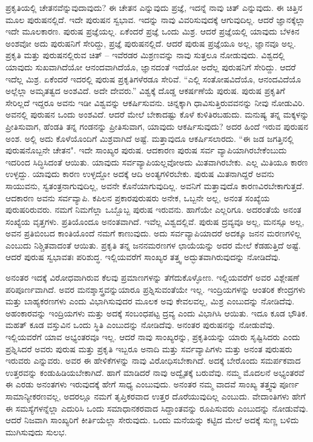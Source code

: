 ಪ್ರಕೃತಿಯಲ್ಲಿ ಚೇತನವೆನ್ನುವುದಾವುದು? ಈ ಚೇತನ ಎನ್ನುವುದು ಪ್ರಜ್ಞೆ, ಇದನ್ನೆ ನಾವು ಚಿತ್ ಎನ್ನುವುದು. ಈ ಚಿತ್ತಿನ ಮೂಲ ಪುರುಷನಲ್ಲಿದೆ. ಇದೇ ಪುರುಷನ ಸ್ವಭಾವ. ಇದನ್ನು ನಾವು ವಿವರಿಸುವುದಕ್ಕೆ ಆಗುವುದಿಲ್ಲ. ಆದರೆ ಜ್ಞಾನಕ್ಕೆಲ್ಲಾ ಇದೇ ಮೂಲಕಾರಣ. ಪುರುಷ ಪ್ರಜ್ಞೆಯಲ್ಲ. ಏಕೆಂದರೆ ಪ್ರಜ್ಞೆ ಒಂದು ಮಿಶ್ರ. ಆದರೆ ಪ್ರಜ್ಞೆಯಲ್ಲಿ ಯಾವುದು ಬೆಳಕಿನ ಅಂಶವೋ ಅದು ಪುರುಷನಿಗೆ ಸೇರಿದ್ದು, ಪ್ರಜ್ಞೆ ಪುರುಷನಲ್ಲಿದೆ. ಆದರೆ ಪುರುಷ ಪ್ರಜ್ಞೆಯೂ ಅಲ್ಲ, ಜ್ಞಾನವೂ ಅಲ್ಲ. ಪ್ರಕೃತಿ ಮತ್ತು ಪುರುಷನಲ್ಲಿರುವ ಚಿತ್ – ಇವೆರಡರ ಮಿಶ್ರಣವನ್ನು ನಾವು ಸುತ್ತಲೂ ನೋಡುವುದು. ವಿಶ್ವದಲ್ಲಿ ಯಾವುದು ಸುಖವಾಗಿದೆಯೋ ಆನಂದವಾಗಿದೆಯೊ, ಜ್ಞಾನದಂತೆ ಇದೆಯೋ ಅದೆಲ್ಲ ಪುರುಷನಿಗೆ ಸೇರಿದ್ದು. ಆದರೆ ಇದೆಲ್ಲ ಮಿಶ್ರ. ಏಕೆಂದರೆ ಇದರಲ್ಲಿ ಪುರುಷ ಪ್ರಕೃತಿಗಳೆರಡೂ ಸೇರಿವೆ. “ಎಲ್ಲಿ ಸಂತೋಷವಿದೆಯೊ, ಆನಂದವಿದೆಯೊ ಅಲ್ಲೆಲ್ಲಾ ಅಮೃತತ್ವದ ಅಂಶವಿದೆ. ಅದೇ ದೇವರು.'' ವಿಶ್ವಕ್ಕೆ ದೊಡ್ಡ ಆಕರ್ಷಣೆಯೆ ಪುರುಷ. ಪುರುಷ ಪ್ರಕೃತಿಗೆ ಸೇರಿಲ್ಲದೆ ಇದ್ದರೂ ಅವನು ಇಡೀ ವಿಶ್ವವನ್ನು ಆಕರ್ಷಿಸುವನು. ಚಿನ್ನಕ್ಕಾಗಿ ಧಾವಿಸುತ್ತಿರುವವನನ್ನು ನೀವು ನೋಡುವಿರಿ. ಅವನಲ್ಲಿ ಪುರುಷನ ಒಂದು ಅಂಶವಿದೆ. ಆದರೆ ಮೇಲೆ ಬೇಕಾದಷ್ಟು ಕೊಳೆ ಕುಳಿತಿರಬಹುದು. ಮನುಷ್ಯ ತನ್ನ ಮಕ್ಕಳನ್ನು ಪ್ರೀತಿಸುವಾಗ, ಹೆಂಡತಿ ತನ್ನ ಗಂಡನನ್ನು ಪ್ರೀತಿಸುವಾಗ, ಯಾವುದು ಆಕರ್ಷಿಸುವುದು? ಅದರ ಹಿಂದೆ ಇರುವ ಪುರುಷನ ಅಂಶ. ಅಲ್ಲಿ ಅದು ಕೊಳೆಯೊಂದಿಗೆ ಮಿಶ್ರವಾಗಿದೆ ಅಷ್ಟೆ. ಮತ್ತಾವುದೂ ಆಕರ್ಷಿಸಲಾರದು. “ಈ ಜಡ ಜಗತ್ತಿನಲ್ಲಿ ಪುರುಷನೊಬ್ಬನೇ ಚೇತನ". ಇದೇ ಸಾಂಖ್ಯರ ಪುರುಷ. ಆದಕಾರಣ ಪುರುಷ ಸರ್ವ ವ್ಯಾಪಿಯಾಗಿರಬೇಕೆಂಬುದು ಇದರಿಂದ ಸಿದ್ಧಿಸಿದಂತೆ ಆಯಿತು. ಯಾವುದು ಸರ್ವವ್ಯಾಪಿಯಲ್ಲವೋ\break ಅದು ಮಿತವಾಗಿರಬೇಕು. ಎಲ್ಲ ಮಿತಿಯೂ ಕಾರಣ ಉಳ್ಳದ್ದು. ಯಾವುದು ಕಾರಣ ಉಳ್ಳದ್ದೋ ಅದಕ್ಕೆ ಆದಿ ಅಂತ್ಯಗಳಿರಬೇಕು. ಪುರುಷ ಮಿತನಾಗಿದ್ದರೆ ಅವನು ಸಾಯುವನು, ಸ್ವತಂತ್ರನಾಗುವುದಿಲ್ಲ, ಅವನೇ ಕೊನೆಯಾಗುವುದಿಲ್ಲ. ಅವನಿಗೆ ಮತ್ತಾವುದೊ ಕಾರಣವಿರಬೇಕಾಗುತ್ತದೆ. ಆದಕಾರಣ ಅವನು ಸರ್ವವ್ಯಾಪಿ. ಕಪಿಲನ ಪ್ರಕಾರ\break ಪುರುಷರು ಅನೇಕ, ಒಬ್ಬನೇ ಅಲ್ಲ, ಅನಂತ ಸಂಖ್ಯೆಯ ಪುರುಷರಿರುವರು. ನಮಗೆ ನಿಮಗೆಲ್ಲಾ ಒಬ್ಬೊಬ್ಬ ಪುರುಷ ಇರುವನು. ಹಾಗೆಯೇ ಎಲ್ಲರಿಗೂ. ಅದರಂತೆಯೆ ಅನಂತ ಸಂಖ್ಯೆಯ ವೃತ್ತಗಳು. ಪ್ರತಿಯೊಂದೂ ಅನಂತವಾಗಿದೆ. ಇವೆಲ್ಲ ವಿಶ್ವದಲ್ಲಿವೆ. ಪುರುಷ ದ್ರವ್ಯವೂ ಅಲ್ಲ, ಮನಸ್ಸೂ ಅಲ್ಲ, ಅವನ ಪ್ರತಿಬಿಂಬದ ಕಾಂತಿಯೊಂದೆ ನಮಗೆ ಕಾಣುವುದು. ಅದು ಸರ್ವವ್ಯಾಪಿಯಾದರೆ ಅದಕ್ಕೂ ಜನನ ಮರಣಗಳಿಲ್ಲ ಎಂಬುದು ನಿಶ್ಚಿತವಾದಂತೆ ಆಯಿತು. ಪ್ರಕೃತಿ ತನ್ನ ಜನನಮರಣಗಳ ಛಾಯೆಯನ್ನು ಅದರ ಮೇಲೆ ಕೆಡಹುತ್ತಿದೆ ಅಷ್ಟೆ. ಆದರೆ ಪುರುಷ ಸ್ವಭಾವತಃ ಪರಿಶುದ್ಧ. ಇಲ್ಲಿಯವರೆಗೆ ಸಾಂಖ್ಯರ ತತ್ತ್ವ ಅದ್ಭುತವಾಗಿರುವುದನ್ನು ನೋಡಿದೆವು.

ಅನಂತರ ಇದಕ್ಕೆ ವಿರೋಧವಾಗಿರುವ ಕೆಲವು ಪ್ರಮಾಣಗಳನ್ನು ತೆಗೆದುಕೊಳ್ಳೋಣ. ಇಲ್ಲಿಯವರೆಗೆ ಅವರ ವಿಶ್ಲೇಷಣೆ ಪರಿಪೂರ್ಣವಾಗಿದೆ. ಅವರ ಮನಶ್ಶಾಸ್ತ್ರವನ್ನು\break ಯಾರೂ ಪ್ರಶ್ನಿಸುವಂತೆಯೇ ಇಲ್ಲ. ಇಂದ್ರಿಯಗಳನ್ನು ಆಂತರಿಕ ಕೇಂದ್ರಗಳು ಮತ್ತು ಬಾಹ್ಯಕರಣಗಳು ಎಂದು ವಿಭಾಗಿಸುವುದರ ಮೂಲಕ ಅವು ಕೇವಲವಲ್ಲ, ಮಿಶ್ರ ಎಂಬುದನ್ನು ನೋಡಿದೆವು. ಅಹಂಕಾರವನ್ನು ಇಂದ್ರಿಯಗಳು ಮತ್ತು ಅದಕ್ಕೆ ಸಂಬಂಧಪಟ್ಟ ದ್ರವ್ಯ ಎಂದು ವಿಭಾಗಿಸಿ ಆಯಿತು. ಇದೂ ಕೂಡ ಭೌತಿಕ. ಮಹತ್ ಕೂಡ ವಸ್ತುವಿನ ಒಂದು ಸ್ಥಿತಿ ಎಂಬುದನ್ನು ನೋಡಿದೆವು. ಅನಂತರ ಪುರುಷನನ್ನು ನೋಡುವೆವು. ಇಲ್ಲಿಯವರೆಗೆ ಯಾವ ಅಭ್ಯಂತರವೂ ಇಲ್ಲ. ಆದರೆ ನಾವು ಸಾಂಖ್ಯರನ್ನು, ಪ್ರಕೃತಿಯನ್ನು ಯಾರು ಸೃಷ್ಟಿಸಿದರು ಎಂದು ಪ್ರಶ್ನಿಸಿದರೆ ಅವರು ಪುರುಷ ಮತ್ತು ಪ್ರಕೃತಿ ಇಬ್ಬರೂ ಅನಾದಿ ಮತ್ತು ಸರ್ವವ್ಯಾಪಿಗಳು ಮತ್ತು ಅನಂತ ಪುರುಷರು ಇರುವರು ಎನ್ನುವರು. ಅವರ ಈ ಹೇಳಿಕೆಗಳನ್ನು ನಾವು ವಿರೋಧಿಸಬೇಕಾಗಿದೆ. ಅದಕ್ಕೆ ಬೇರೊಂದು ಸಮರ್ಪಕವಾದ ಉತ್ತರವನ್ನು ಕಂಡುಹಿಡಿಯಬೇಕಾಗಿದೆ. ಹಾಗೆ ಮಾಡಿದರೆ ನಾವು ಅದ್ವೈತಕ್ಕೆ ಬರುವೆವು. ನಮ್ಮ ಮೊದಲನೆ ಅಭ್ಯಂತರವೆ ಈ ಎರಡು ಅನಂತಗಳು ಇರುವುದಕ್ಕೆ ಹೇಗೆ ಸಾಧ್ಯ ಎಂಬುವುದು. ಅನಂತರ ನಮ್ಮ ವಾದವೆ ಸಾಂಖ್ಯ ತತ್ತ್ವವು ಪೂರ್ಣ ಸಾಮಾನ್ಯೀಕರಣವಲ್ಲ, ಅದರಲ್ಲೂ ನಮಗೆ ತೃಪ್ತಿಕರವಾದ ಉತ್ತರ ದೊರೆಯುವುದಿಲ್ಲ ಎಂಬುದು. ವೇದಾಂತಿಗಳು ಹೇಗೆ ಈ ಸಮಸ್ಯೆಗಳನ್ನೆಲ್ಲಾ ಎದುರಿಸಿ ಒಂದು ಸಮಾಧಾನಕರವಾದ ಸಿದ್ದಾಂತವನ್ನು ರೂಪಿಸುವರು ಎಂಬುದನ್ನು ನೋಡುವೆವು. ಆದರೆ ನಿಜವಾಗಿ ಸಾಂಖ್ಯರಿಗೆ ಕೀರ್ತಿಯೆಲ್ಲಾ ಸೇರುವುದು. ಒಂದು ಮನೆಯನ್ನು ಕಟ್ಟಿದ ಮೇಲೆ ಅದಕ್ಕೆ ಸುಣ್ಣ ಬಳಿದು ಮುಗಿಸುವುದು ಸುಲಭ.

